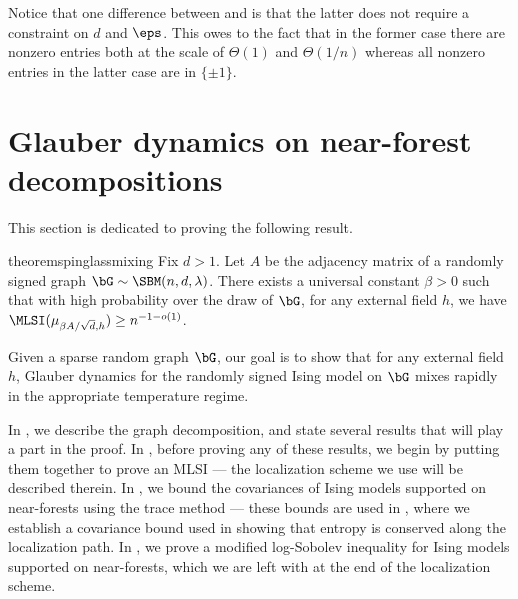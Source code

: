 \documentclass[11pt,letterpaper]{article}
\begin{document}
    \begin{remark}
        Notice that one difference between  and  is that the latter does not require a constraint on $d$ and $\eps$.
        This owes to the fact that in the former case there are nonzero entries both at the scale of $\Theta(1)$ and $\Theta(1/n)$ whereas all nonzero entries in the latter case are in $\{\pm1\}$.
    \end{remark}

    


\section{Glauber dynamics on near-forest decompositions}
\label{sec:spinglass}

This section is dedicated to proving the following result.

\begin{restatable}{theorem}{spinglassmixing}
    \label{thm:main-mixing}
    Fix $d > 1$. Let $A$ be the adjacency matrix of a randomly signed graph $\bG \sim \SBM(n, d, \lambda)$. There exists a universal constant $\beta > 0$ such that with high probability over the draw of $\bG$, for any external field $h$, we have $\MLSI(\mu_{\beta A/\sqrt{d}, h}) \ge n^{-1 - o(1)}$. 
\end{restatable}
    
Given a sparse random graph $\bG$, our goal is to show that for any external field $h$, Glauber dynamics for the randomly signed Ising model on $\bG$ mixes rapidly in the appropriate temperature regime.

In , we describe the graph decomposition, and state several results that will play a part in the proof. In , before proving any of these results, we begin by putting them together to prove an MLSI --- the localization scheme we use will be described therein. In , we bound the covariances of Ising models supported on near-forests using the trace method --- these bounds are used in , where we establish a covariance bound used in showing that entropy is conserved along the localization path. In , we prove a modified log-Sobolev inequality for Ising models supported on near-forests, which we are left with at the end of the localization scheme.
\end{document}
